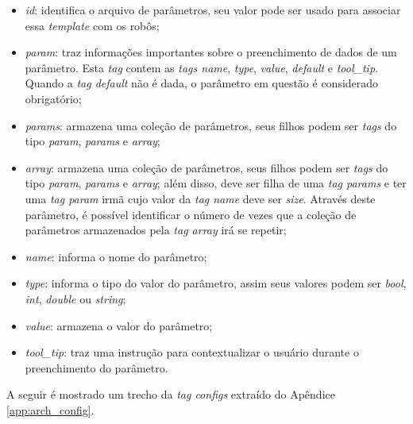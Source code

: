             \begin{itemize}
                \item \textit{id}: identifica o arquivo de parâmetros, seu valor pode ser usado para associar essa \textit{template} com os robôs;
                \item \textit{param}: traz informações importantes sobre o preenchimento de dados de um parâmetro. Esta \textit{tag} contem as \textit{tags name}, \textit{type}, \textit{value}, \textit{default} e \textit{tool\_tip}. Quando a \textit{tag default} não é dada, o parâmetro em questão é considerado obrigatório;
                \item \textit{params}: armazena uma coleção de parâmetros, seus filhos podem ser \textit{tags} do tipo \textit{param}, \textit{params} e \textit{array};
                \item \textit{array}: armazena uma coleção de parâmetros, seus filhos podem ser \textit{tags} do tipo \textit{param}, \textit{params} e \textit{array}; além disso, deve ser filha de uma \textit{tag params} e ter uma \textit{tag param} irmã cujo valor da \textit{tag name} deve ser \textit{size}. Através deste parâmetro, é possível identificar o número de vezes que a coleção de parâmetros armazenados pela \textit{tag array} irá se repetir;
                \item \textit{name}: informa o nome do parâmetro;
                \item \textit{type}: informa o tipo do valor do parâmetro, assim seus valores podem ser \textit{bool}, \textit{int}, \textit{double} ou \textit{string};
                \item \textit{value}: armazena o valor do parâmetro;
                \item \textit{tool\_tip}: traz uma instrução para contextualizar o usuário durante o preenchimento do parâmetro.
            \end{itemize}
            A seguir é mostrado um trecho da \textit{tag configs} extraído do Apêndice \ref{app:arch_config}.
            
